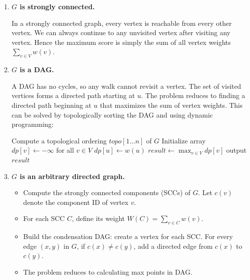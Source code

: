 \documentclass[12pt,a4paper]{article}
\theoremstyle{definition}
\begin{document}
\begin{enumerate}
    \begin{enumerate}
    \item \textbf{$G$ is strongly connected.}
    
    In a strongly connected graph, every vertex is reachable from every other vertex. 
    We can always continue to any unvisited vertex after visiting any vertex. 
    Hence the maximum score is simply the sum of all vertex weights $\sum_{v\in V} w(v)$.
    
    \item \textbf{$G$ is a DAG.}
    
    A DAG has no cycles, so any walk cannot revisit a vertex.
    The set of visited vertices forms a directed path starting at $u$. 
    The problem reduces to finding a directed path beginning at $u$ that maximizes the sum of vertex weights. 
    This can be solved by topologically sorting the DAG and using dynamic programming:

    \begin{algorithm}[H]
        \LinesNumbered
        \BlankLine
        \caption{Max Points in DAG} \label{Algorithm DAG}
        
        Compute a topological ordering $topo[1\dots n]$ of $G$\;
        Initialize array $dp[v] \leftarrow -\infty$ for all $v \in V$\;
        $dp[u] \leftarrow w(u)$\;
        $result \leftarrow \max_{v \in V} dp[v]$\;
        output $result$\;
    \end{algorithm}
    
    \item \textbf{$G$ is an arbitrary directed graph.}
    
    \begin{itemize}
    \item Compute the strongly connected components (SCCs) of $G$. Let $c(v)$ denote the component ID of vertex $v$.
    \item For each SCC $C$, define its weight $W(C) = \sum_{v\in C} w(v)$.
    \item Build the condensation DAG: create a vertex for each SCC. For every edge $(x,y)$ in $G$, if $c(x) \neq c(y)$, add a directed edge from $c(x)$ to $c(y)$.
    \item The problem reduces to calculating max points in DAG.
    \end{itemize}


\end{enumerate}
\end{enumerate}
\end{document}
